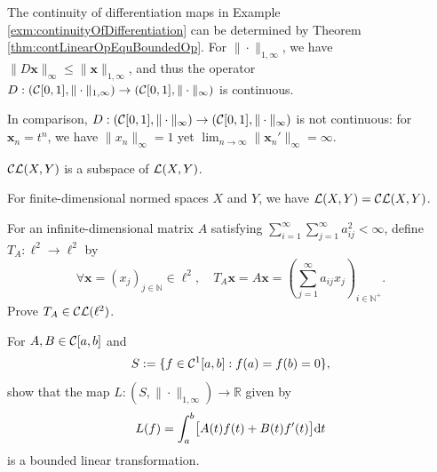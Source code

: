 \begin{exm}
  The continuity of differentiation maps in Example
  \ref{exm:continuityOfDifferentiation}
  can be determined by Theorem \ref{thm:contLinearOpEquBoundedOp}.
  For $\|\cdot\|_{1,\infty}$,
  we have $\|D \mathbf{x}\|_{\infty} \le \|\mathbf{x}\|_{1,\infty}$, 
  and thus the operator $D: \left({\cal C}[0,1],\|\cdot\|_{1,\infty}\right)
  \rightarrow \left({\cal C}[0,1],\|\cdot\|_{\infty}\right)$
  is continuous.
  
  In comparison,
  $D: \left({\cal C}[0,1],\|\cdot\|_{\infty}\right)
  \rightarrow \left({\cal C}[0,1],\|\cdot\|_{\infty}\right)$
  is not continuous: 
  for $\mathbf{x}_n=t^n$, we have $\|x_n\|_{\infty}=1$ yet 
  $\lim_{n\rightarrow \infty} \|\mathbf{x}_n'\|_{\infty} = \infty$.
\end{exm}

\begin{coro}
  \label{coro:CLXYisSubspaceOfLXY}
  ${\cal CL}(X,Y)$ is a subspace of ${\cal L}(X,Y)$.
\end{coro}

\begin{coro}
  \label{coro:finiteDimCLXYisLXY}
  For finite-dimensional normed spaces $X$ and $Y$,
  we have ${\cal L}(X,Y)={\cal CL}(X,Y)$.
\end{coro}

\begin{exc}
  For an infinite-dimensional matrix $A$ satisfying
  $\sum_{i=1}^{\infty}\sum_{j=1}^{\infty}a_{ij}^2<\infty$,
  define $T_A: \ell^2\rightarrow \ell^2$
  by
  \begin{equation}
    \label{eq:inftMatrixL2}
    \forall \mathbf{x}=(x_j)_{j\in \mathbb{N}}\in \ell^2,\quad
    T_A \mathbf{x} = A \mathbf{x} =
    \left(\sum_{j=1}^{\infty} a_{ij}x_j \right)_{i\in \mathbb{N}^+}.
  \end{equation}
  Prove $T_A\in {\cal CL}(\ell^2)$.
\end{exc}

\begin{exc}
  For $A,B\in {\cal C}[a,b]$ and
  \begin{equation}
    \label{eq:C10}
    S := \{f\in {\cal C}^1[a,b]: f(a)=f(b)=0\}, 
  \end{equation}
  show that the map 
  $L: (S, \|\cdot\|_{1,\infty}) \rightarrow \mathbb{R}$
  given by
  \begin{displaymath}
    L(f) = \int_a^b \bigl[A(t)f(t)+B(t)f'(t)\bigr] \mathrm{d} t
  \end{displaymath}
  is a bounded linear transformation.
\end{exc}

